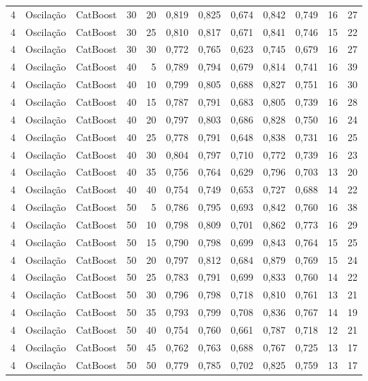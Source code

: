 \begin{longtable}{@{}rllrrrrrrrrr@{}}
4 & Oscilação & CatBoost & 30 & 20 & 0,819 & 0,825 & 0,674 & 0,842 & 0,749 & 16 & 27 \\
4 & Oscilação & CatBoost & 30 & 25 & 0,810 & 0,817 & 0,671 & 0,841 & 0,746 & 15 & 22 \\
4 & Oscilação & CatBoost & 30 & 30 & 0,772 & 0,765 & 0,623 & 0,745 & 0,679 & 16 & 27 \\
4 & Oscilação & CatBoost & 40 & 5 & 0,789 & 0,794 & 0,679 & 0,814 & 0,741 & 16 & 39 \\
4 & Oscilação & CatBoost & 40 & 10 & 0,799 & 0,805 & 0,688 & 0,827 & 0,751 & 16 & 30 \\
4 & Oscilação & CatBoost & 40 & 15 & 0,787 & 0,791 & 0,683 & 0,805 & 0,739 & 16 & 28 \\
4 & Oscilação & CatBoost & 40 & 20 & 0,797 & 0,803 & 0,686 & 0,828 & 0,750 & 16 & 24 \\
4 & Oscilação & CatBoost & 40 & 25 & 0,778 & 0,791 & 0,648 & 0,838 & 0,731 & 16 & 25 \\
4 & Oscilação & CatBoost & 40 & 30 & 0,804 & 0,797 & 0,710 & 0,772 & 0,739 & 16 & 23 \\
4 & Oscilação & CatBoost & 40 & 35 & 0,756 & 0,764 & 0,629 & 0,796 & 0,703 & 13 & 20 \\
4 & Oscilação & CatBoost & 40 & 40 & 0,754 & 0,749 & 0,653 & 0,727 & 0,688 & 14 & 22 \\
4 & Oscilação & CatBoost & 50 & 5 & 0,786 & 0,795 & 0,693 & 0,842 & 0,760 & 16 & 38 \\
4 & Oscilação & CatBoost & 50 & 10 & 0,798 & 0,809 & 0,701 & 0,862 & 0,773 & 16 & 29 \\
4 & Oscilação & CatBoost & 50 & 15 & 0,790 & 0,798 & 0,699 & 0,843 & 0,764 & 15 & 25 \\
4 & Oscilação & CatBoost & 50 & 20 & 0,797 & 0,812 & 0,684 & 0,879 & 0,769 & 15 & 24 \\
4 & Oscilação & CatBoost & 50 & 25 & 0,783 & 0,791 & 0,699 & 0,833 & 0,760 & 14 & 22 \\
4 & Oscilação & CatBoost & 50 & 30 & 0,796 & 0,798 & 0,718 & 0,810 & 0,761 & 13 & 21 \\
4 & Oscilação & CatBoost & 50 & 35 & 0,793 & 0,799 & 0,708 & 0,836 & 0,767 & 14 & 19 \\
4 & Oscilação & CatBoost & 50 & 40 & 0,754 & 0,760 & 0,661 & 0,787 & 0,718 & 12 & 21 \\
4 & Oscilação & CatBoost & 50 & 45 & 0,762 & 0,763 & 0,688 & 0,767 & 0,725 & 13 & 17 \\
4 & Oscilação & CatBoost & 50 & 50 & 0,779 & 0,785 & 0,702 & 0,825 & 0,759 & 13 & 17 \\

\end{longtable}

